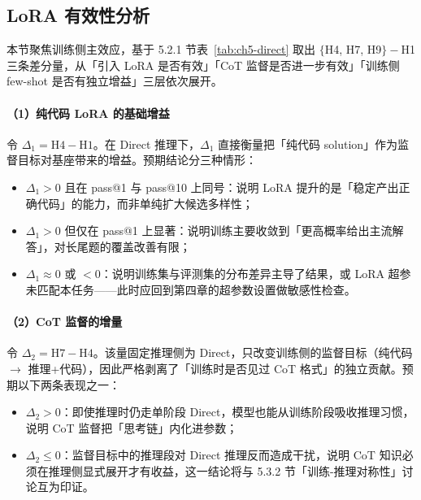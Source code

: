 \subsection{LoRA 有效性分析}

本节聚焦训练侧主效应，基于 5.2.1 节表~\ref{tab:ch5-direct} 取出 $\{$H4, H7, H9$\} - $H1 三条差分量，从「引入 LoRA 是否有效」「CoT 监督是否进一步有效」「训练侧 few-shot 是否有独立增益」三层依次展开。

\paragraph{（1）纯代码 LoRA 的基础增益}
令 $\Delta_1 = \mathrm{H4} - \mathrm{H1}$。在 Direct 推理下，$\Delta_1$ 直接衡量把「纯代码 solution」作为监督目标对基座带来的增益。预期结论分三种情形：
\begin{itemize}
    \item $\Delta_1 > 0$ 且在 pass@1 与 pass@10 上同号：说明 LoRA 提升的是「稳定产出正确代码」的能力，而非单纯扩大候选多样性；
    \item $\Delta_1 > 0$ 但仅在 pass@1 上显著：说明训练主要收敛到「更高概率给出主流解答」，对长尾题的覆盖改善有限；
    \item $\Delta_1 \approx 0$ 或 $< 0$：说明训练集与评测集的分布差异主导了结果，或 LoRA 超参未匹配本任务——此时应回到第四章的超参数设置做敏感性检查。
\end{itemize}

\paragraph{（2）CoT 监督的增量}
令 $\Delta_2 = \mathrm{H7} - \mathrm{H4}$。该量固定推理侧为 Direct，只改变训练侧的监督目标（纯代码 $\to$ 推理+代码），因此严格剥离了「训练时是否见过 CoT 格式」的独立贡献。预期以下两条表现之一：
\begin{itemize}
    \item $\Delta_2 > 0$：即使推理时仍走单阶段 Direct，模型也能从训练阶段吸收推理习惯，说明 CoT 监督把「思考链」内化进参数；
    \item $\Delta_2 \le 0$：监督目标中的推理段对 Direct 推理反而造成干扰，说明 CoT 知识必须在推理侧显式展开才有收益，这一结论将与 5.3.2 节「训练-推理对称性」讨论互为印证。
\end{itemize}


